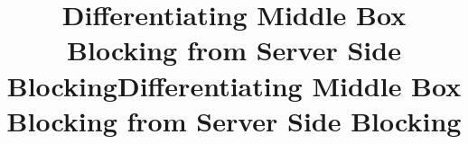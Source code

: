\documentclass[sigconf, table, anonymous]{acmart}
\newcommand\fulltitle{Differentiating Middle Box Blocking from Server Side Blocking}
\renewcommand{\footnotesize}{\scriptsize}
\begin{document}
\renewcommand{\sectionautorefname}{\S}
\renewcommand{\subsectionautorefname}{\S}
\renewcommand{\subsubsectionautorefname}{\S}

\title{\fulltitle}
\title[\fulltitle]{\fulltitle}

\maketitle
\sloppy











\end{document}
